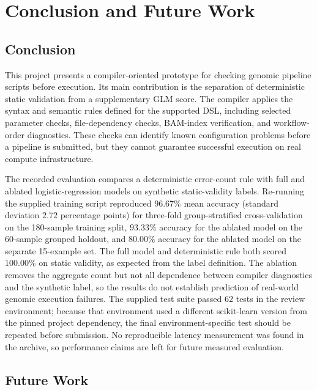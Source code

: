 \documentclass[12pt,a4paper]{article}
\begin{document}
\newpage

\section{Conclusion and Future Work}

\subsection{Conclusion}

This project presents a compiler-oriented prototype for checking genomic pipeline scripts before execution. Its main contribution is the separation of deterministic static validation from a supplementary GLM score. The compiler applies the syntax and semantic rules defined for the supported DSL, including selected parameter checks, file-dependency checks, BAM-index verification, and workflow-order diagnostics. These checks can identify known configuration problems before a pipeline is submitted, but they cannot guarantee successful execution on real compute infrastructure.

The recorded evaluation compares a deterministic error-count rule with full and ablated logistic-regression models on synthetic static-validity labels. Re-running the supplied training script reproduced $96.67\%$ mean accuracy (standard deviation $2.72$ percentage points) for three-fold group-stratified cross-validation on the 180-sample training split, $93.33\%$ accuracy for the ablated model on the 60-sample grouped holdout, and $80.00\%$ accuracy for the ablated model on the separate 15-example set. The full model and deterministic rule both scored $100.00\%$ on static validity, as expected from the label definition. The ablation removes the aggregate count but not all dependence between compiler diagnostics and the synthetic label, so the results do not establish prediction of real-world genomic execution failures. The supplied test suite passed 62 tests in the review environment; because that environment used a different scikit-learn version from the pinned project dependency, the final environment-specific test should be repeated before submission. No reproducible latency measurement was found in the archive, so performance claims are left for future measured evaluation.

\subsection{Future Work}
\end{document}
